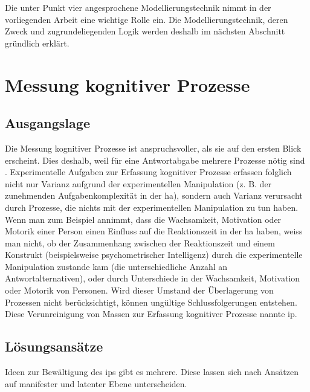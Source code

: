 \documentclass[11pt, twoside, a4paper]{book}		%
\begin{document}
Die unter Punkt vier angesprochene Modellierungstechnik nimmt in der vorliegenden Arbeit eine wichtige Rolle ein. Die Modellierungstechnik, deren Zweck und zugrundeliegenden Logik werden deshalb im nächsten Abschnitt gründlich erklärt.


\section{Messung kognitiver Prozesse}

\subsection{Ausgangslage}

Die Messung kognitiver Prozesse ist anspruchsvoller, als sie auf den ersten Blick erscheint. Dies deshalb, weil für eine Antwortabgabe mehrere Prozesse nötig sind \citep[]{Jensen1982b, Miller2013, Neubauer1997a, Schweizer2007, Unsworth2007, vanZomeren1994}. Experimentelle Aufgaben zur Erfassung kognitiver Prozesse erfassen folglich nicht nur Varianz aufgrund der experimentellen Manipulation (z. B. der zunehmenden Aufgabenkomplexität in der \gls{ha}), sondern auch Varianz verursacht durch Prozesse, die nichts mit der experimentellen Manipulation zu tun haben. 
Wenn man zum Beispiel annimmt, dass die Wachsamkeit, Motivation oder Motorik einer Person einen Einfluss auf die Reaktionszeit in der \gls{ha} haben, weiss man nicht, ob der Zusammenhang zwischen der Reaktionszeit und einem Konstrukt (beispielsweise psychometrischer Intelligenz) durch die experimentelle Manipulation zustande kam (die unterschiedliche Anzahl an Antwortalternativen), oder durch Unterschiede in der Wachsamkeit, Motivation oder Motorik von Personen. Wird dieser Umstand der Überlagerung von Prozessen nicht berücksichtigt, können ungültige Schlussfolgerungen entstehen. 
Diese Verunreinigung von Massen zur Erfassung kognitiver Prozesse nannte \citet{Schweizer2007} \gls{ip}.


\subsection{Lösungsansätze}

Ideen zur Bewältigung des \gls{ip}s gibt es mehrere. Diese lassen sich nach Ansätzen auf manifester und latenter Ebene unterscheiden. 
\end{document}
